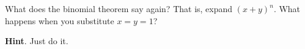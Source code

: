 \documentclass{book}
\begin{document}
\setcounter{cpjt}{79}
\addtocounter{cpjt}{-1}
\begin{activity}\label{act-pascalrowsum-binom}
\hypertarget{p-587}{}%
What does the binomial theorem say again?  That is, expand \((x+y)^n\).  What happens when you substitute \(x = y = 1\)?%
\par\smallskip%
\noindent\textbf{Hint}.\hypertarget{hint-36}{}\quad%
\hypertarget{p-588}{}%
Just do it.%
\end{activity}

\clearpage
\end{document}
